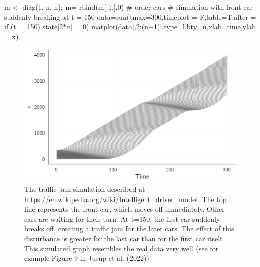 \documentclass[
  a4paper,
  DIV=11,
  numbers=noendperiod,
  oneside]{scrreprt}
\newenvironment{Shaded}{\begin{snugshade}}{\end{snugshade}}
\newcommand{\AttributeTok}[1]{\textcolor[rgb]{0.40,0.45,0.13}{#1}}
\newcommand{\CommentTok}[1]{\textcolor[rgb]{0.37,0.37,0.37}{#1}}
\newcommand{\DecValTok}[1]{\textcolor[rgb]{0.68,0.00,0.00}{#1}}
\newcommand{\FunctionTok}[1]{\textcolor[rgb]{0.28,0.35,0.67}{#1}}
\newcommand{\NormalTok}[1]{\textcolor[rgb]{0.00,0.23,0.31}{#1}}
\newcommand{\OtherTok}[1]{\textcolor[rgb]{0.00,0.23,0.31}{#1}}
\newcommand{\SpecialCharTok}[1]{\textcolor[rgb]{0.37,0.37,0.37}{#1}}
\newcommand{\StringTok}[1]{\textcolor[rgb]{0.13,0.47,0.30}{#1}}
\begin{document}
\begin{Shaded}
\begin{Highlighting}[]
\NormalTok{m }\OtherTok{\textless{}{-}} \FunctionTok{diag}\NormalTok{(}\DecValTok{1}\NormalTok{, n, n); m}\OtherTok{=} \FunctionTok{rbind}\NormalTok{(m[}\SpecialCharTok{{-}}\DecValTok{1}\NormalTok{,],}\DecValTok{0}\NormalTok{) }\CommentTok{\# order cars}
\CommentTok{\# simulation with front car suddenly breaking at t = 150}
\NormalTok{data}\OtherTok{=}\FunctionTok{run}\NormalTok{(}\AttributeTok{tmax=}\DecValTok{300}\NormalTok{,}\AttributeTok{timeplot =}\NormalTok{ F,}\AttributeTok{table=}\NormalTok{T,}\AttributeTok{after =} \StringTok{\textquotesingle{}if (t==150) state[2*n] = 0\textquotesingle{}}\NormalTok{)}
\FunctionTok{matplot}\NormalTok{(data[,}\DecValTok{2}\SpecialCharTok{:}\NormalTok{(n}\SpecialCharTok{+}\DecValTok{1}\NormalTok{)],}\AttributeTok{type=}\StringTok{\textquotesingle{}l\textquotesingle{}}\NormalTok{,}\AttributeTok{bty=}\StringTok{\textquotesingle{}n\textquotesingle{}}\NormalTok{,}\AttributeTok{xlab=}\StringTok{\textquotesingle{}time\textquotesingle{}}\NormalTok{,}\AttributeTok{ylab =} \StringTok{\textquotesingle{}x\textquotesingle{}}\NormalTok{)}
\end{Highlighting}
\end{Shaded}

\begin{figure}

{\centering \includegraphics{media/ch4n/fig-ch4n-img6-old-54.png}

}

\caption{\label{fig-ch4n-img6-old-54}The traffic jam simulation
described at https://en.wikipedia.org/wiki/Intelligent\_driver\_model.
The top line represents the front car, which moves off immediately.
Other cars are waiting for their turn. At t=150, the first car suddenly
breaks off, creating a traffic jam for the later cars. The effect of
this disturbance is greater for the last car than for the first car
itself. This simulated graph resembles the real data very well (see for
example Figure 9 in Jusup et al. (2022)).}

\end{figure}
\end{document}
